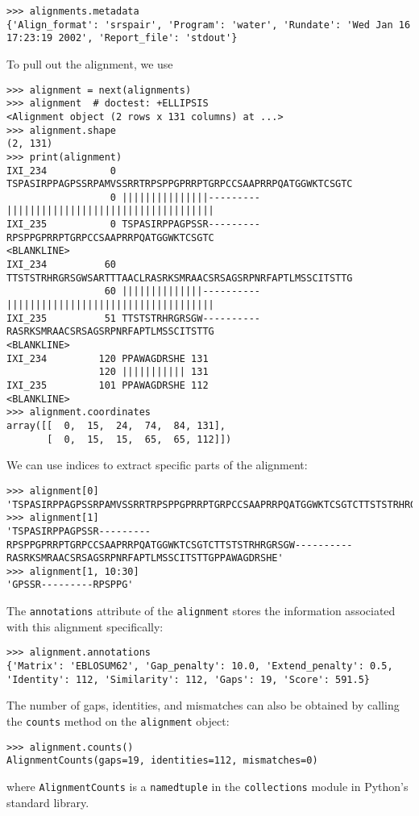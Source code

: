 \begin{verbatim}
>>> alignments.metadata
{'Align_format': 'srspair', 'Program': 'water', 'Rundate': 'Wed Jan 16 17:23:19 2002', 'Report_file': 'stdout'}
\end{verbatim}
To pull out the alignment, we use
\begin{verbatim}
>>> alignment = next(alignments)
>>> alignment  # doctest: +ELLIPSIS
<Alignment object (2 rows x 131 columns) at ...>
>>> alignment.shape
(2, 131)
>>> print(alignment)
IXI_234           0 TSPASIRPPAGPSSRPAMVSSRRTRPSPPGPRRPTGRPCCSAAPRRPQATGGWKTCSGTC
                  0 |||||||||||||||---------||||||||||||||||||||||||||||||||||||
IXI_235           0 TSPASIRPPAGPSSR---------RPSPPGPRRPTGRPCCSAAPRRPQATGGWKTCSGTC
<BLANKLINE>
IXI_234          60 TTSTSTRHRGRSGWSARTTTAACLRASRKSMRAACSRSAGSRPNRFAPTLMSSCITSTTG
                 60 ||||||||||||||----------||||||||||||||||||||||||||||||||||||
IXI_235          51 TTSTSTRHRGRSGW----------RASRKSMRAACSRSAGSRPNRFAPTLMSSCITSTTG
<BLANKLINE>
IXI_234         120 PPAWAGDRSHE 131
                120 ||||||||||| 131
IXI_235         101 PPAWAGDRSHE 112
<BLANKLINE>
>>> alignment.coordinates
array([[  0,  15,  24,  74,  84, 131],
       [  0,  15,  15,  65,  65, 112]])
\end{verbatim}
We can use indices to extract specific parts of the alignment:
\begin{verbatim}
>>> alignment[0]
'TSPASIRPPAGPSSRPAMVSSRRTRPSPPGPRRPTGRPCCSAAPRRPQATGGWKTCSGTCTTSTSTRHRGRSGWSARTTTAACLRASRKSMRAACSRSAGSRPNRFAPTLMSSCITSTTGPPAWAGDRSHE'
>>> alignment[1]
'TSPASIRPPAGPSSR---------RPSPPGPRRPTGRPCCSAAPRRPQATGGWKTCSGTCTTSTSTRHRGRSGW----------RASRKSMRAACSRSAGSRPNRFAPTLMSSCITSTTGPPAWAGDRSHE'
>>> alignment[1, 10:30]
'GPSSR---------RPSPPG'
\end{verbatim}
The \verb|annotations| attribute of the \verb|alignment| stores the information associated with this alignment specifically:
\begin{verbatim}
>>> alignment.annotations
{'Matrix': 'EBLOSUM62', 'Gap_penalty': 10.0, 'Extend_penalty': 0.5, 'Identity': 112, 'Similarity': 112, 'Gaps': 19, 'Score': 591.5}
\end{verbatim}
The number of gaps, identities, and mismatches can also be obtained by calling the \verb|counts| method on the \verb|alignment| object:
\begin{verbatim}
>>> alignment.counts()
AlignmentCounts(gaps=19, identities=112, mismatches=0)
\end{verbatim}
where \verb|AlignmentCounts| is a \verb|namedtuple| in the \verb|collections| module in Python's standard library.

